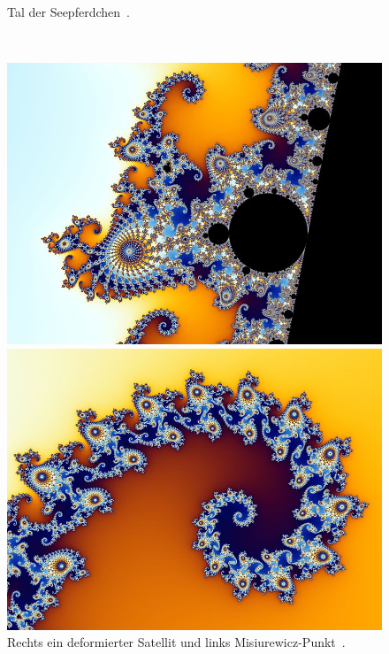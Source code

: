 \begin{figure}[H]
\begin{minipage}[t]{0.40\textwidth}
    \vspace*{-4ex}
    \caption{\grqq Tal der Seepferdchen\glqq~\cite{beyer_partial_2005-1}.}
    \label{app:6.2}
  \end{minipage}
  \\[4ex]
  \begin{minipage}[t]{0.40\textwidth}
    \centering
    \includegraphics[width=\linewidth]{images/zoom/800px-Mandel_zoom_03_seehorse}
    \vspace*{-4ex}
    \caption{Rechts ein deformierter Satellit und links Misiurewicz-Punkt~\cite{beyer_partial_2005-2}.}
    \label{app:6.3}
  \end{minipage}%
  \hspace{8ex}
  \begin{minipage}[t]{0.40\textwidth}
    \centering
    \includegraphics[width=\linewidth]{images/zoom/800px-Mandel_zoom_04_seehorse_tail}

\end{minipage}
\end{figure}
